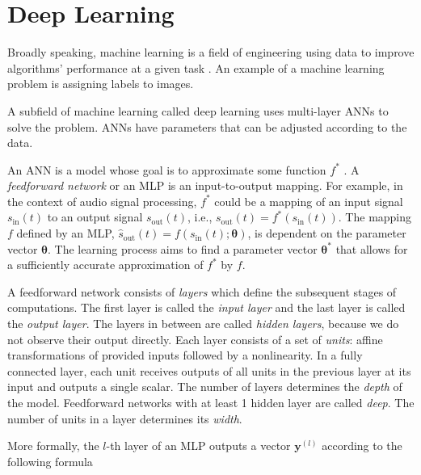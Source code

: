 
\section{Deep Learning}
\label{section:deep_learning}

Broadly speaking, machine learning is a field of engineering using data to improve algorithms' performance at a given task \cite{Goodfellow-et-al-2016}. An example of a machine learning problem is assigning labels to images.

A subfield of machine learning called deep learning uses multi-layer \acp{ANN} to solve the problem. \Acp{ANN} have parameters that can be adjusted according to the data.

An \ac{ANN} is a model whose goal is to approximate some function $f^*$ \cite{Goodfellow-et-al-2016}. A \emph{feedforward network} or an \ac{MLP} is an input-to-output mapping. For example, in the context of audio signal processing, $f^*$ could be a mapping of an input signal $s_\text{in}(t)$ to an output signal $s_\text{out}(t)$, i.e., $s_\text{out}(t) = f^*(s_\text{in}(t))$. The mapping $f$ defined by an \ac{MLP}, $\hat{s}_\text{out}(t) = f(s_\text{in}(t); \pmb{\theta})$, is dependent on the parameter vector $\pmb{\theta}$. The learning process aims to find a parameter vector $\pmb{\theta^*}$ that allows for a sufficiently accurate approximation of $f^*$ by $f$.


A feedforward network consists of \emph{layers} which define the subsequent stages of computations. The first layer is called the \emph{input layer} and the last layer is called the \emph{output layer}. The layers in between are called \emph{hidden layers}, because we do not observe their output directly. Each layer consists of a set of \emph{units}: affine transformations of provided inputs followed by a nonlinearity. In a fully connected layer, each unit receives outputs of all units in the previous layer at its input and outputs a single scalar. The number of layers determines the \emph{depth} of the model. Feedforward networks with at least 1 hidden layer are called \emph{deep}. The number of units in a layer determines its \emph{width}.

More formally, the $l$-th layer of an \ac{MLP} outputs a vector $\pmb{y}^{(l)}$ according to the following formula

